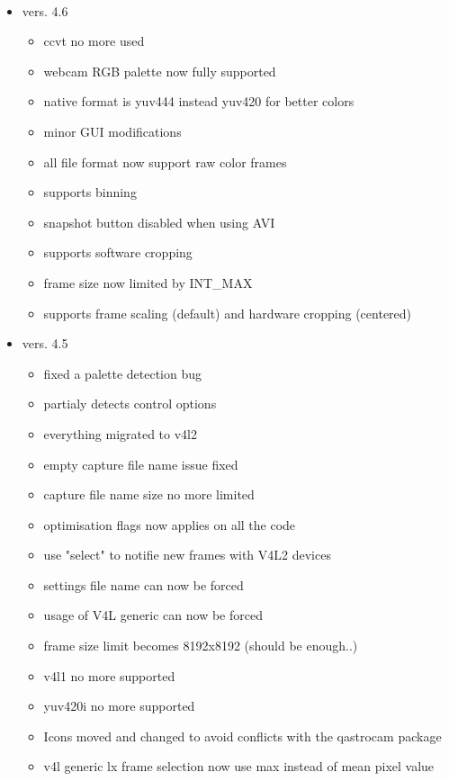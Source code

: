 \documentclass[11pt,a4paper]{book}
\begin{document}
\paragraph*{}
\renewcommand\labelitemi{\textbullet}
\begin{itemize}
\item vers. 4.6
\begin{itemize}
\item ccvt no more used     
\item webcam RGB palette now fully supported
\item native format is yuv444 instead yuv420 for better colors
\item minor GUI modifications
\item all file format now support raw color frames
\item supports binning
\item snapshot button disabled when using AVI
\item supports software cropping
\item frame size now limited by INT\_MAX
\item supports frame scaling (default) and hardware cropping (centered)
\end{itemize}
\item vers. 4.5
\begin{itemize}
\item fixed a palette detection bug
\item partialy detects control options
\item everything migrated to v4l2
\item empty capture file name issue fixed
\item capture file name size no more limited
\item optimisation flags now applies on all the code
\item use "select" to notifie new frames with V4L2 devices
\item settings file name can now be forced
\item usage of V4L generic can now be forced
\item frame size limit becomes 8192x8192 (should be enough..)
\item v4l1 no more supported
\item yuv420i no more supported
\item Icons moved and changed to avoid conflicts with the qastrocam package
\item v4l generic lx frame selection now use max instead of mean pixel value

\end{itemize}
\end{itemize}
\end{document}
